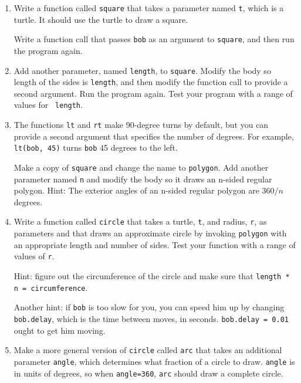 \documentclass[10pt]{book}
\begin{document}
\begin{enumerate}

\item Write a function called {\tt square} that takes a parameter
named {\tt t}, which is a turtle.  It should use the turtle to draw
a square.

Write a function call that passes {\tt bob} as an argument to
{\tt square}, and then run the program again.

\item Add another parameter, named {\tt length}, to {\tt square}.
Modify the body so length of the sides is {\tt length}, and then
modify the function call to provide a second argument.  Run the
program again.  Test your program with a range of values for {\tt
length}.

\item The functions {\tt lt} and {\tt rt} make 90-degree turns by
default, but you can provide a second argument that specifies the
number of degrees.  For example, {\tt lt(bob, 45)} turns {\tt bob} 45
degrees to the left.

Make a copy of {\tt square} and change the name to {\tt polygon}.  Add
another parameter named {\tt n} and modify the body so it draws an
n-sided regular polygon.  Hint: The exterior angles of an n-sided regular
polygon are $360/n$ degrees.

\item Write a function called {\tt circle} that takes a turtle, {\tt t},
and radius, {\tt r}, as parameters and that draws an approximate circle
by invoking {\tt polygon} with an appropriate length and number of
sides.  Test your function with a range of values of {\tt r}.

Hint: figure out the circumference of the circle and make sure that
{\tt length * n = circumference}.

Another hint: if {\tt bob} is too slow for you, you can speed
him up by changing {\tt bob.delay}, which is the time between moves,
in seconds.  {\tt bob.delay = 0.01} ought to get him moving.


\item Make a more general version of {\tt circle} called {\tt arc}
that takes an additional parameter {\tt angle}, which determines
what fraction of a circle to draw.  {\tt angle} is in units of
degrees, so when {\tt angle=360}, {\tt arc} should draw a complete
circle.

\end{enumerate}
\end{document}
